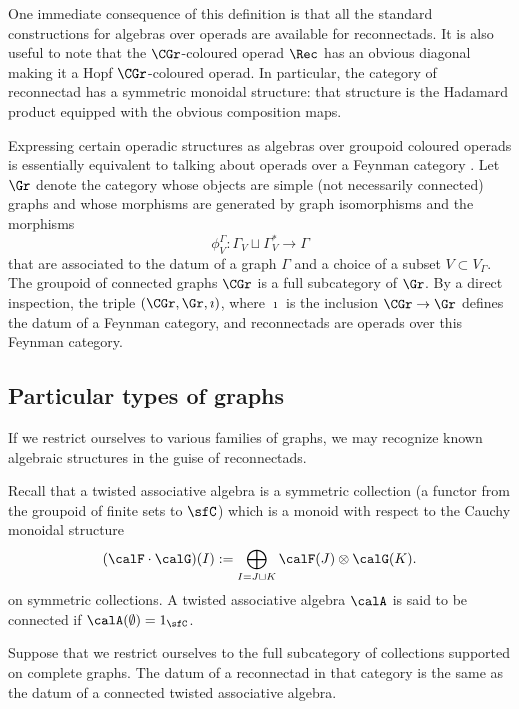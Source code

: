 One immediate consequence of this definition is that all the standard constructions for algebras over operads are available for reconnectads. It is also useful to note that the $\CGr$-coloured operad $\Rec$ has an obvious diagonal making it a Hopf $\CGr$-coloured operad. In particular, the category of reconnectad has a symmetric monoidal structure: that structure is the Hadamard product equipped with the obvious composition maps.

\begin{rema}\label{rem:Feynman}
Expressing certain operadic structures as algebras over groupoid coloured operads is essentially equivalent to talking about operads over a Feynman category \cite{MR3636409}. Let $\Gr$ denote the category whose objects are simple (not necessarily connected) graphs and whose morphisms are generated by graph isomorphisms and the morphisms
 \[
\phi^\Gamma_V \colon \Gamma_V\sqcup\Gamma^*_V  \to \Gamma
 \]
that are associated to the datum of a graph $\Gamma$ and a choice of a subset $V\subset V_\Gamma$. The groupoid of connected graphs $\CGr$ is a full subcategory of $\Gr$. By a direct inspection, the triple $(\CGr,\Gr,\imath)$, where $\imath$ is the inclusion $\CGr\to\Gr$ defines the datum of a Feynman category, and reconnectads are operads over this Feynman category.  
\end{rema}

\subsection{Particular types of graphs}\label{sec:part-types}

If we restrict ourselves to various families of graphs, we may recognize known algebraic structures in the guise of reconnectads. 

Recall that a twisted associative algebra is a symmetric collection (a functor from the groupoid of finite sets to $\sfC$) which is a monoid with respect to the Cauchy monoidal structure 
 \[
(\calF\cdot\calG)(I):=\bigoplus_{I=J\sqcup K}\calF(J)\otimes\calG(K). 
 \]
on symmetric collections. A twisted associative algebra $\calA$ is said to be connected if $\calA(\emptyset)=1_{\sfC}$.

\begin{prop}\label{prop:LM}
Suppose that we restrict ourselves to the full subcategory of collections supported on complete graphs. The datum of a reconnectad in that category is the same as the datum of a connected twisted associative algebra.
\end{prop}

